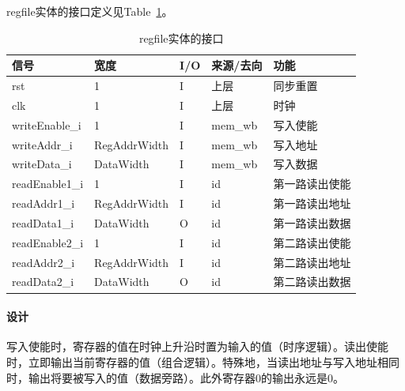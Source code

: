 \documentclass{article}
\begin{document}
\begin{spacing}{1.4}
regfile实体的接口定义见Table~\ref{tb:regfile-interface}。
\begin{table}[!htb]
\begin{center}
\begin{tabular*}{15cm}{l|l|l|l|p{5cm}}
\hline
\textbf{信号}&\textbf{宽度}&\textbf{I/O}&\textbf{来源/去向}&\textbf{功能} \\
\hline rst                     & 1                      & I     & 上层          & 同步重置 \\
\hline clk                     & 1                      & I     & 上层          & 时钟 \\
\hline writeEnable\_i          & 1                      & I     & mem\_wb       & 写入使能 \\
\hline writeAddr\_i            & RegAddrWidth           & I     & mem\_wb       & 写入地址 \\
\hline writeData\_i            & DataWidth              & I     & mem\_wb       & 写入数据 \\
\hline readEnable1\_i          & 1                      & I     & id            & 第一路读出使能 \\
\hline readAddr1\_i            & RegAddrWidth           & I     & id            & 第一路读出地址 \\
\hline readData1\_i            & DataWidth              & O     & id            & 第一路读出数据 \\
\hline readEnable2\_i          & 1                      & I     & id            & 第二路读出使能 \\
\hline readAddr2\_i            & RegAddrWidth           & I     & id            & 第二路读出地址 \\
\hline readData2\_i            & DataWidth              & O     & id            & 第二路读出数据 \\
\hline
\end{tabular*}
\caption{regfile实体的接口}
\label{tb:regfile-interface}
\end{center}
\end{table}

\paragraph{设计}\mbox{}

写入使能时，寄存器的值在时钟上升沿时置为输入的值（时序逻辑）。读出使能时，立即输出当前寄存器的值（组合逻辑）。特殊地，当读出地址与写入地址相同时，输出将要被写入的值（数据旁路）。此外寄存器0的输出永远是0。


\end{spacing}
\end{document}
